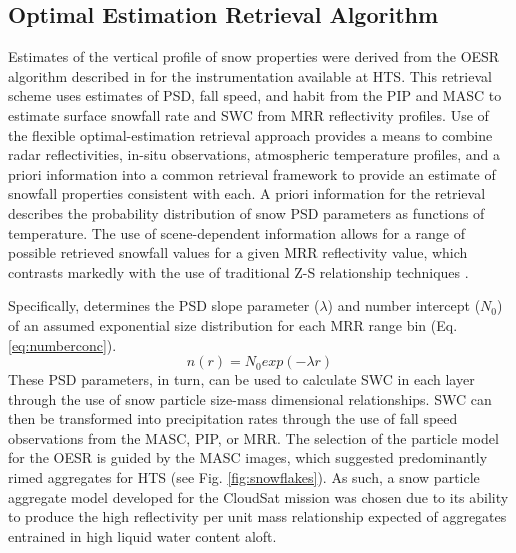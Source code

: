 \documentclass{ametsocV5}
\begin{document}
    \subsection{Optimal Estimation Retrieval Algorithm}\label{sec:methodology:oesr}
        Estimates of the vertical profile of snow properties were derived from the OESR algorithm described in \citet{schirle_estimation_2019} for the instrumentation available at HTS. This retrieval scheme uses estimates of PSD, fall speed, and habit from the PIP and MASC to estimate surface snowfall rate and SWC from MRR reflectivity profiles. Use of the flexible optimal-estimation retrieval approach \citep{rodgers_inverse_2000} provides a means to combine radar reflectivities, in-situ observations, atmospheric temperature profiles, and a priori information into a common retrieval framework to provide an estimate of snowfall properties consistent with each. A priori information for the retrieval describes the probability distribution of snow PSD parameters as functions of temperature. The use of scene-dependent information allows for a range of possible retrieved snowfall values for a given MRR reflectivity value, which contrasts markedly with the use of traditional Z-S relationship techniques \citep{friedrich_quantifying_2020}.  
        
        Specifically, \citet{schirle_estimation_2019} determines the PSD slope parameter ($\lambda$) and number intercept ($N_0$) of an assumed exponential size distribution for each MRR range bin (Eq. \ref{eq:numberconc}).
        \begin{equation}
            n(r) = N_0 exp(-\lambda r)
            \label{eq:numberconc}
        \end{equation}
        These PSD parameters, in turn, can be used to calculate SWC in each layer through the use of snow particle size-mass dimensional relationships. SWC can then be transformed into precipitation rates through the use of fall speed observations from the MASC, PIP, or MRR. The selection of the particle model for the OESR is guided by the MASC images, which suggested predominantly rimed aggregates for HTS (see Fig. \ref{fig:snowflakes}). As such, a snow particle aggregate model \citep{wood_microphysical_2015} developed for the CloudSat mission was chosen due to its ability to produce the high reflectivity per unit mass relationship expected of aggregates entrained in high liquid water content aloft.  
        
\end{document}
